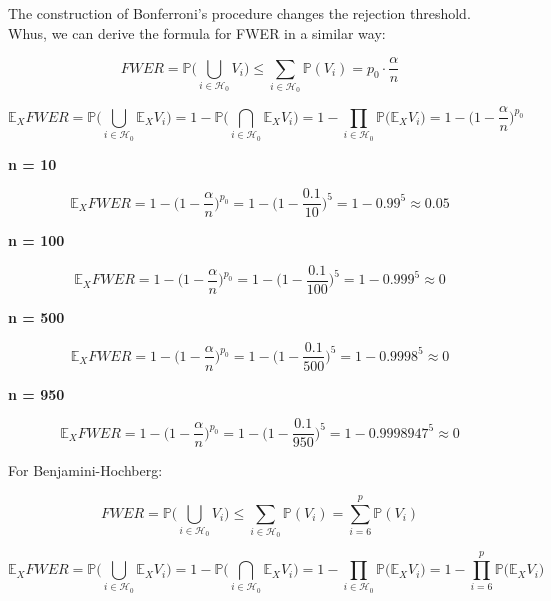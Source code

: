 \documentclass[
]{article}
\begin{document}
The construction of Bonferroni's procedure changes the rejection
threshold. Whus, we can derive the formula for FWER in a similar way:

\[FWER = \mathbb P \Big(\bigcup_{i \in \mathcal H_0} V_i \Big) \leq \sum_{i \in \mathcal H_0} \mathbb P(V_i) = p_0 \cdot \frac \alpha n\]

\[\mathbb E_X FWER = \mathbb P \Big(\bigcup_{i \in \mathcal H_0} \mathbb E _XV_i \Big) = 1 - \mathbb P \Big(\bigcap_{i \in \mathcal H_0} \mathbb E _XV_i \Big) = 1 - \prod_{i \in \mathcal H_0}\mathbb  P \big(\mathbb E_X V_i\big) = 1 - \Big(1 - \frac \alpha n\Big)^{p_0}\]

\textbf{n = 10}

\begin{displaymath} 
 \mathbb E_X FWER = 1 - \Big(1 - \frac \alpha n\Big)^{p_0} = 1 - \Big(1 - \frac {0.1} {10} \Big)^{5} = 1 - 0.99^5 \approx 0.05
\end{displaymath}

\textbf{n = 100}

\begin{displaymath} 
 \mathbb E_X FWER = 1 - \Big(1 - \frac \alpha n\Big)^{p_0} = 1 - \Big(1 - \frac {0.1} {100} \Big)^{5} = 1 - 0.999^5 \approx 0
\end{displaymath}

\textbf{n = 500}

\begin{displaymath} 
 \mathbb E_X FWER = 1 - \Big(1 - \frac \alpha n\Big)^{p_0} = 1 - \Big(1 - \frac {0.1} {500} \Big)^{5} = 1 - 0.9998^5 \approx 0
\end{displaymath}

\textbf{n = 950}

\begin{displaymath} 
 \mathbb E_X FWER = 1 - \Big(1 - \frac \alpha n\Big)^{p_0} = 1 - \Big(1 - \frac {0.1} {950} \Big)^{5} = 1 - 0.9998947^5 \approx 0
\end{displaymath}

For Benjamini-Hochberg:

\[FWER = \mathbb P \Big(\bigcup_{i \in \mathcal H_0} V_i \Big) \leq \sum_{i \in \mathcal H_0} \mathbb P(V_i) = \sum_{i = 6}^{p} \mathbb P(V_i)\]

\[\mathbb E_X FWER = \mathbb P \Big(\bigcup_{i \in \mathcal H_0} \mathbb E _XV_i \Big) = 1 - \mathbb P \Big(\bigcap_{i \in \mathcal H_0} \mathbb E _XV_i \Big) = 1 - \prod_{i \in \mathcal H_0}\mathbb  P \big(\mathbb E_X V_i\big)  = 1 - \prod_{i = 6}^p\mathbb  P \big(\mathbb E_X V_i\big)\]
\end{document}
